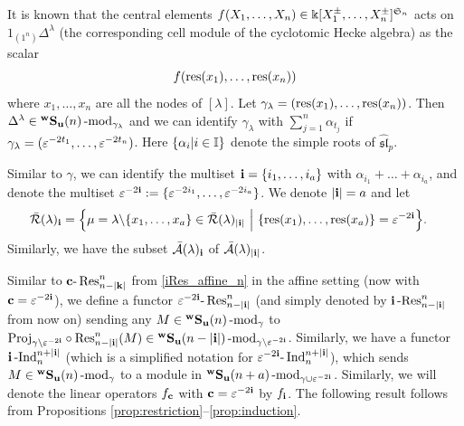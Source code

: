 It is known that the central elements 
$f(X_1,\ldots,X_n)\in \Bbbk[X_1^\pm,\ldots,X_n^\pm]^{\mathfrak S_n} $ acts on $1_{(1^n)}\Delta^\lambda$ (the corresponding cell module of the cyclotomic Hecke algebra) as the scalar
\[f(\operatorname{res}\nolimits(x_1), \ldots, \operatorname{res}\nolimits(x_n))\]
where $x_1,\ldots, x_n$ are all the nodes of $[\lambda]$. 
Let $\gamma_\lambda=(\operatorname{res}\nolimits(x_1), \ldots, \operatorname{res}\nolimits(x_n))$. Then 
$\Delta^\lambda\in {}^{\bold{w}}\bold{S}_{\mathbf{u}}(n)\operatorname{-mod}\nolimits_{\gamma_\lambda}$ and we can identify $\gamma_\lambda$ with $\sum_{j=1}^n\alpha_{t_j}$ if $ \gamma_\lambda=(\varepsilon^{-2t_1}, \ldots, \varepsilon^{-2t_n} )$. Here $\{\alpha_i|i\in \mathbb{I}\}$ denote the simple roots of $\widehat {\mathfrak {sl}}_p$.

Similar to $\gamma$, we can identify the multiset $\mathbf{i}=\{i_1,\ldots, i_a\}$ with $ \alpha_{i_1}+\ldots+ \alpha_{i_a}$, and denote the multiset $\varepsilon^{-2\mathbf{i}}:=\{\varepsilon^{-2i_1},\ldots, \varepsilon^{-2i_a}\}$.  We denote $|\mathbf{i}|=a$ and let 
\begin{align*}
    \bar{ \mathcal R}(\lambda)_{\mathbf{i}} &=\Big\{\mu=\lambda\backslash\{x_1,\ldots,x_a\} \in \bar {\mathcal R}(\lambda)_{|\mathbf{i}|} ~\Big |~ 
    \{\operatorname{res}\nolimits(x_1),\ldots, \operatorname{res}\nolimits(x_a) \}= \varepsilon^{-2\mathbf{i}} 
    \Big\}.
\end{align*}
Similarly, we have the subset 
$\bar{ \mathcal A}(\lambda)_{\mathbf{i}} $ of $\bar{ \mathcal A}(\lambda)_{|\mathbf{i}|}$.

Similar to $\mathbf{c}\text{-}\operatorname{Res}\nolimits^n_{n-|\mathbf{k}|}$ from \eqref{iRes_affine_n} in the affine setting (now with $\mathbf{c}=\varepsilon^{-2\mathbf{i}}$), we define a functor $\varepsilon^{-2\mathbf{i}}\text{-}\operatorname{Res}\nolimits^n_{n-|\mathbf{i}|}$ (and simply denoted by $\mathbf{i}\operatorname{-Res}\nolimits^n_{n-|\mathbf{i}|}$ from now on) sending any $M\in {}^{\bold{w}}\bold{S}_{\mathbf{u}}(n)\operatorname{-mod}\nolimits_\gamma$ to $\text{Proj}_{\gamma\setminus\varepsilon^{-2\mathbf{i}}}\circ \text{Res}^n_{n-|\mathbf{i}|}(M) \in {}^{\bold{w}}\bold{S}_{\mathbf{u}}(n-|\mathbf{i}|)\operatorname{-mod}\nolimits_{\gamma\setminus\varepsilon^{-2\mathbf{i}}} $.
Similarly, we have a functor $\mathbf{i}\operatorname{-Ind}\nolimits^{n+|\mathbf{i}|}_n$ (which is a simplified notation for $\varepsilon^{-2\mathbf{i}}\text{-}\operatorname{Ind}\nolimits^{n+|\mathbf{i}|}_n$), which sends $M\in {}^{\bold{w}}\bold{S}_{\mathbf{u}}(n)\operatorname{-mod}\nolimits_\gamma$ to a module in ${}^{\bold{w}}\bold{S}_{\mathbf{u}}(n+a)\operatorname{-mod}\nolimits_{\gamma\cup\varepsilon^{-2\mathbf{i}}} $. Similarly, we will denote the linear operators $f_{\mathbf{c}}$ with $\mathbf{c}={\varepsilon^{-2\mathbf{i}}}$ by $f_{\mathbf{i}}$. The following result follows from  Propositions \ref{prop:restriction}--\ref{prop:induction}.

